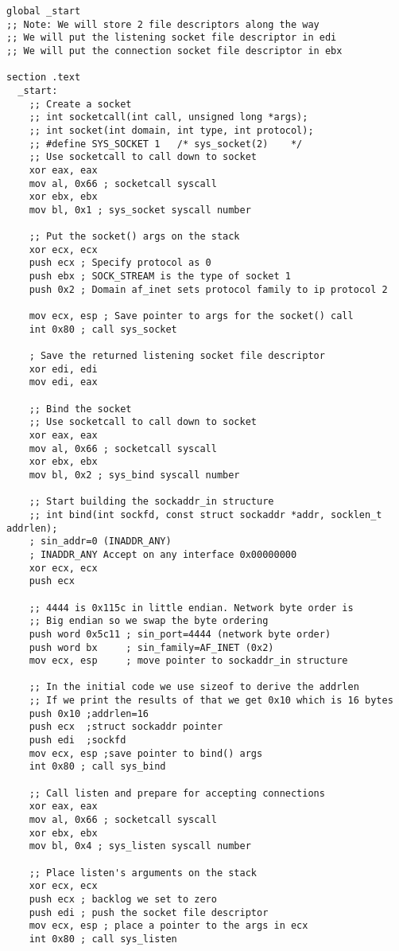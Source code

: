 \documentclass[11pt]{article}
\begin{document}
\begin{verbatim}
global _start
;; Note: We will store 2 file descriptors along the way
;; We will put the listening socket file descriptor in edi
;; We will put the connection socket file descriptor in ebx

section .text
  _start:
    ;; Create a socket
    ;; int socketcall(int call, unsigned long *args);
    ;; int socket(int domain, int type, int protocol);
    ;; #define SYS_SOCKET 1   /* sys_socket(2)    */
    ;; Use socketcall to call down to socket
    xor eax, eax
    mov al, 0x66 ; socketcall syscall
    xor ebx, ebx
    mov bl, 0x1 ; sys_socket syscall number

    ;; Put the socket() args on the stack
    xor ecx, ecx
    push ecx ; Specify protocol as 0
    push ebx ; SOCK_STREAM is the type of socket 1
    push 0x2 ; Domain af_inet sets protocol family to ip protocol 2

    mov ecx, esp ; Save pointer to args for the socket() call
    int 0x80 ; call sys_socket

    ; Save the returned listening socket file descriptor
    xor edi, edi
    mov edi, eax

    ;; Bind the socket
    ;; Use socketcall to call down to socket
    xor eax, eax
    mov al, 0x66 ; socketcall syscall
    xor ebx, ebx
    mov bl, 0x2 ; sys_bind syscall number

    ;; Start building the sockaddr_in structure
    ;; int bind(int sockfd, const struct sockaddr *addr, socklen_t addrlen);
    ; sin_addr=0 (INADDR_ANY)
    ; INADDR_ANY Accept on any interface 0x00000000
    xor ecx, ecx
    push ecx

    ;; 4444 is 0x115c in little endian. Network byte order is
    ;; Big endian so we swap the byte ordering
    push word 0x5c11 ; sin_port=4444 (network byte order)
    push word bx     ; sin_family=AF_INET (0x2)
    mov ecx, esp     ; move pointer to sockaddr_in structure

    ;; In the initial code we use sizeof to derive the addrlen
    ;; If we print the results of that we get 0x10 which is 16 bytes
    push 0x10 ;addrlen=16
    push ecx  ;struct sockaddr pointer
    push edi  ;sockfd
    mov ecx, esp ;save pointer to bind() args
    int 0x80 ; call sys_bind

    ;; Call listen and prepare for accepting connections
    xor eax, eax
    mov al, 0x66 ; socketcall syscall
    xor ebx, ebx
    mov bl, 0x4 ; sys_listen syscall number

    ;; Place listen's arguments on the stack
    xor ecx, ecx
    push ecx ; backlog we set to zero
    push edi ; push the socket file descriptor
    mov ecx, esp ; place a pointer to the args in ecx
    int 0x80 ; call sys_listen


\end{verbatim}
\end{document}
